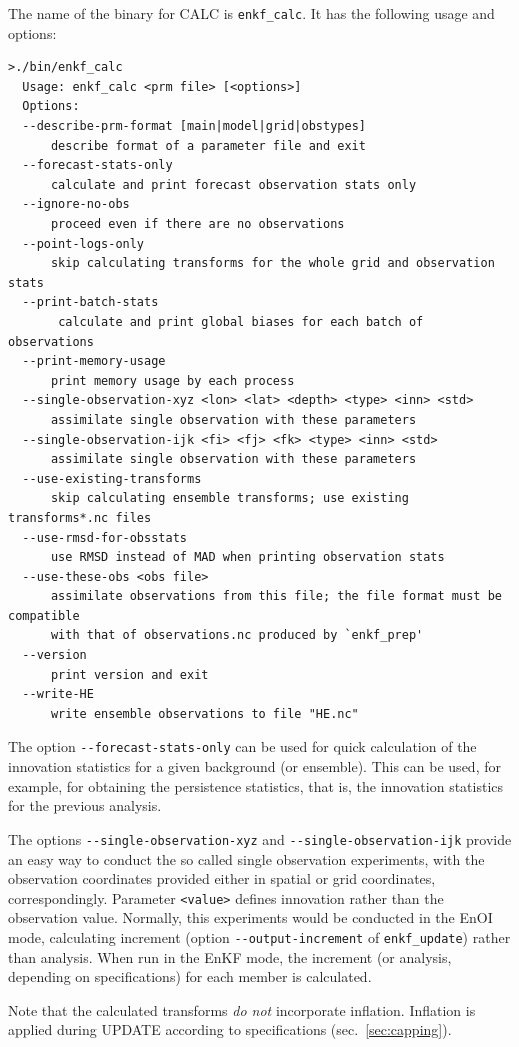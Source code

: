 \documentclass[11pt]{report}
\begin{document}
The name of the binary for CALC is \verb|enkf_calc|.
It has the following usage and options:
\begin{Verbatim}[frame=single,fontsize=\footnotesize]
>./bin/enkf_calc 
  Usage: enkf_calc <prm file> [<options>]
  Options:
  --describe-prm-format [main|model|grid|obstypes]
      describe format of a parameter file and exit
  --forecast-stats-only
      calculate and print forecast observation stats only
  --ignore-no-obs
      proceed even if there are no observations
  --point-logs-only
      skip calculating transforms for the whole grid and observation stats
  --print-batch-stats
       calculate and print global biases for each batch of observations
  --print-memory-usage
      print memory usage by each process
  --single-observation-xyz <lon> <lat> <depth> <type> <inn> <std>
      assimilate single observation with these parameters
  --single-observation-ijk <fi> <fj> <fk> <type> <inn> <std>
      assimilate single observation with these parameters
  --use-existing-transforms
      skip calculating ensemble transforms; use existing transforms*.nc files
  --use-rmsd-for-obsstats
      use RMSD instead of MAD when printing observation stats
  --use-these-obs <obs file>
      assimilate observations from this file; the file format must be compatible
      with that of observations.nc produced by `enkf_prep'
  --version
      print version and exit
  --write-HE
      write ensemble observations to file "HE.nc"
\end{Verbatim}

The option \verb|--forecast-stats-only| can be used for quick calculation of the innovation statistics for a given background (or ensemble).
This can be used, for example, for obtaining the persistence statistics, that is, the innovation statistics for the previous analysis.

The options \verb|--single-observation-xyz| and \verb|--single-observation-ijk| provide an easy way to conduct the so called single observation experiments, with the observation coordinates provided either in spatial or grid coordinates, correspondingly.
Parameter \verb|<value>| defines innovation rather than the observation value.
Normally, this experiments would be conducted in the EnOI mode, calculating increment (option \verb|--output-increment| of \verb|enkf_update|) rather than analysis.
When run in the EnKF mode, the increment (or analysis, depending on specifications) for each member is calculated.

Note that the calculated transforms \emph{do not} incorporate inflation.
Inflation is applied during UPDATE according to specifications (sec.~\ref{sec:capping}).
\end{document}
